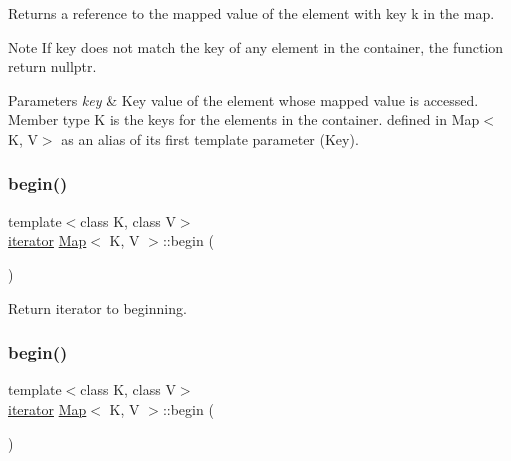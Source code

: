 Returns a reference to the mapped value of the element with key k in the map.

\begin{DoxyNote}{Note}
If key does not match the key of any element in the container, the function return nullptr. 
\end{DoxyNote}

\begin{DoxyParams}{Parameters}
{\em key} & Key value of the element whose mapped value is accessed. Member type K is the keys for the elements in the container. defined in Map$<$\+K, V$>$ as an alias of its first template parameter (Key). \\
\hline
\end{DoxyParams}
\mbox{\label{classMap_a34cb1bcee32679df8fd3b43f5260e4e9}} 
\subsubsection{\texorpdfstring{begin()}{begin()}\hspace{0.1cm}{\footnotesize\ttfamily [1/4]}}
{\footnotesize\ttfamily template$<$class K, class V$>$ \\
\hyperlink{classMap_ad1f372a2028b9f46497e873b0e984e84}{iterator} \hyperlink{classMap}{Map}$<$ K, V $>$\+::begin (\begin{DoxyParamCaption}{ }\end{DoxyParamCaption})\hspace{0.3cm}{\ttfamily [inline]}}

Return iterator to beginning. \mbox{\label{classMap_a34cb1bcee32679df8fd3b43f5260e4e9}} 
\subsubsection{\texorpdfstring{begin()}{begin()}\hspace{0.1cm}{\footnotesize\ttfamily [2/4]}}
{\footnotesize\ttfamily template$<$class K, class V$>$ \\
\hyperlink{classMap_ad1f372a2028b9f46497e873b0e984e84}{iterator} \hyperlink{classMap}{Map}$<$ K, V $>$\+::begin (\begin{DoxyParamCaption}{ }\end{DoxyParamCaption})\hspace{0.3cm}{\ttfamily [inline]}}

